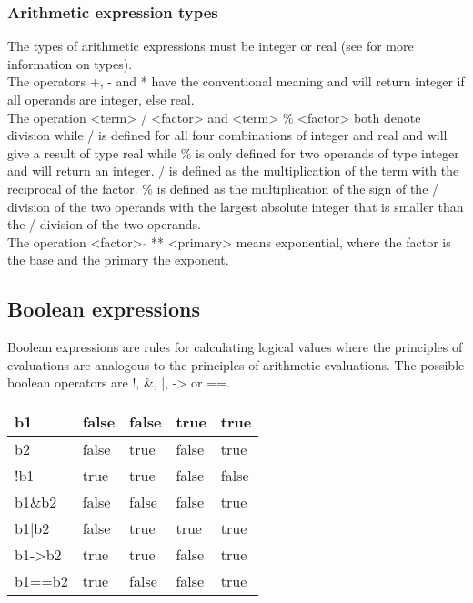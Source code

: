 \documentclass{article}
\begin{document}
\subsubsection{Arithmetic expression types} \label{arithexptypes}
The types of arithmetic expressions must be integer or real (see  for more information on types).\\
The operators +, - and * have the conventional meaning and will return integer if all operands are integer, else real.\\
The operation <term> / <factor> and <term> \% <factor> both denote division while / is defined for all four combinations of integer and real and will give a result of type real while \% is only defined for two operands of type integer and will return an integer. / is defined as the multiplication of the term with the reciprocal of the factor. \% is defined as the multiplication of the sign of the / division of the two operands with the largest absolute integer that is smaller than the / division of the two operands.\\
The operation <factor> $\hat{}$ ** <primary> means exponential, where the factor is the base and the primary the exponent.

\subsection{Boolean expressions}
Boolean expressions are rules for calculating logical values where the principles of evaluations are analogous to the principles of arithmetic evaluations. The possible boolean operators are !, \&, |, -\textgreater{} or ==. 

\begin{table}[h]
	\begin{tabular}{|l|l|l|l|l|}
		\hline
		b1                  & false & false & true  & true  \\ \hline
		b2                  & false & true  & false & true  \\ \hline
		!b1                 & true  & true  & false & false \\ \hline
		b1\&b2              & false & false & false & true  \\ \hline
		b1|b2               & false & true  & true  & true  \\ \hline
		b1-\textgreater{}b2 & true  & true  & false & true  \\ \hline
		b1==b2              & true  & false & false & true  \\ \hline
	\end{tabular}
\end{table}
\end{document}
